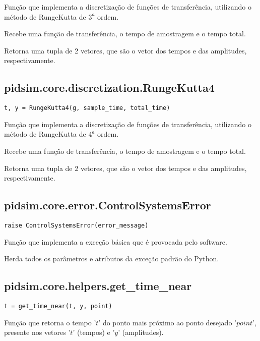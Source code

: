     Função que implementa a discretização de funções de transferência,
    utilizando o método de RungeKutta de $3^a$ ordem.
    
    Recebe uma função de transferência, o tempo de amostragem e o tempo
    total.
    
    Retorna uma tupla de 2 vetores, que são o vetor dos tempos e das amplitudes,
    respectivamente.

\subsection{pidsim.core.discretization.RungeKutta4}

    \begin{verbatim}
t, y = RungeKutta4(g, sample_time, total_time)\end{verbatim}
    
    Função que implementa a discretização de funções de transferência,
    utilizando o método de RungeKutta de $4^a$ ordem.
    
    Recebe uma função de transferência, o tempo de amostragem e o tempo
    total.
    
    Retorna uma tupla de 2 vetores, que são o vetor dos tempos e das amplitudes,
    respectivamente.

\subsection{pidsim.core.error.ControlSystemsError}

    \begin{verbatim}
raise ControlSystemsError(error_message)\end{verbatim}
    
    Função que implementa a exceção básica que é provocada pelo software.
    
    Herda todos os parâmetros e atributos da exceção padrão do Python.

\subsection{pidsim.core.helpers.get\_time\_near}

    \begin{verbatim}
t = get_time_near(t, y, point)\end{verbatim}
    
    Função que retorna o tempo '$t$' do ponto mais próximo ao ponto
    desejado '$point$', presente nos vetores '$t$' (tempos) e '$y$'
    (amplitudes).
    
